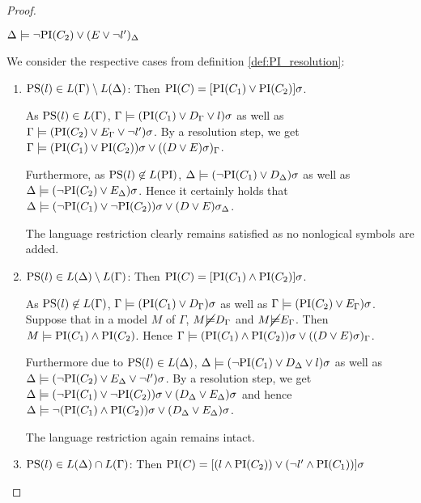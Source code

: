 \begin{proof}
\begin{itemize}
	$\Delta \models \lnot \mathrm{PI}(C_2) \lor (E\lor \lnot l')_\Delta$

		We consider the respective cases from definition \ref{def:PI_resolution}:

			\begin{enumerate}
				\item $\mathrm{PS}(l) \in L(\Gamma) \setminus L(\Delta)$:
					\label{huang_proof_prop_case_1}
					Then $\mathrm{PI}(C) = [\mathrm{PI}(C_1) \lor \mathrm{PI}(C_2)]\sigma$. 

					As $\mathrm{PS}(l) \in L(\Gamma)$,
					$\Gamma \models (\mathrm{PI}(C_1) \lor D_\Gamma\lor l)\sigma$
					as well as $\Gamma \models (\mathrm{PI}(C_2) \lor E_\Gamma\lor \lnot l')\sigma$.
					By a resolution step, we get $\Gamma \models (\mathrm{PI}(C_1) \lor \mathrm{PI}(C_2))\sigma \lor ((D \lor E)\sigma)_\Gamma$.

					Furthermore, as $\mathrm{PS}(l) \not\in L(\mathrm{PI})$, 
					$\Delta \models (\lnot\mathrm{PI}(C_1) \lor D_\Delta)\sigma$
					as well as $\Delta \models (\lnot\mathrm{PI}(C_2) \lor E_\Delta)\sigma$.
					Hence it certainly holds that $\Delta \models (\lnot \mathrm{PI}(C_1) \lor \lnot\mathrm{PI}(C_2))\sigma \lor (D \lor E)\sigma_\Delta$.

					The language restriction clearly remains satisfied as no nonlogical symbols are added.

				\item $\mathrm{PS}(l) \in L(\Delta) \setminus L(\Gamma)$: 
					\label{huang_proof_prop_case_2}
					Then $\mathrm{PI}(C) = [\mathrm{PI}(C_1) \land \mathrm{PI}(C_2)]\sigma$. 

					As $\mathrm{PS}(l) \not\in L(\Gamma)$,
					$\Gamma \models (\mathrm{PI}(C_1) \lor D_\Gamma)\sigma$
					as well as $\Gamma \models (\mathrm{PI}(C_2) \lor E_\Gamma)\sigma$.
					Suppose that in a model $M$ of $\Gamma$, $M \cancel {\models} D_\Gamma$ and $M \cancel {\models} E_\Gamma$. Then $M \models \mathrm{PI}(C_1) \land \mathrm{PI}(C_2)$.
					Hence 
					$\Gamma \models (\mathrm{PI}(C_1) \land \mathrm{PI}(C_2))\sigma \lor ((D \lor E)\sigma)_\Gamma$.

					Furthermore due to $\mathrm{PS}(l) \in L(\Delta)$,
					$\Delta \models (\lnot\mathrm{PI}(C_1) \lor D_\Delta \lor l)\sigma$
					as well as $\Delta \models (\lnot\mathrm{PI}(C_2) \lor E_\Delta \lor \lnot l')\sigma$.
					By a resolution step, we get $\Delta \models (\lnot\mathrm{PI}(C_1) \lor \lnot\mathrm{PI}(C_2))\sigma \lor (D_\Delta \lor E_\Delta)\sigma $
					and hence 
					$\Delta \models \lnot (\mathrm{PI}(C_1) \land \mathrm{PI}(C_2))\sigma \lor (D_\Delta \lor E_\Delta)\sigma $.

					The language restriction again remains intact.

				\item $\mathrm{PS}(l) \in L(\Delta) \cap L(\Gamma)$:
					Then $\mathrm{PI}(C) = [(l \land \mathrm{PI}(C_2)) \lor (\lnot l' \land \mathrm{PI}(C_1)) ]\sigma $


\end{enumerate}
\end{itemize}
\end{proof}
